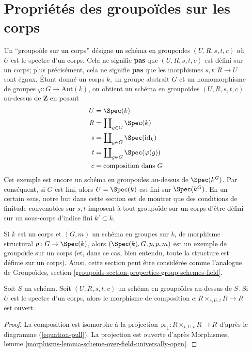 \section{Propriétés des groupoïdes sur les corps}
\label{section-properties-groupoids-on-fields}

\noindent
Un ``groupoïde sur un corps'' désigne un schéma en groupoïdes $(U, R, s, t, c)$
où $U$ est le spectre d'un corps. Cela ne signifie {\bf pas} que
$(U, R, s, t, c)$ est défini sur un corps; plus précisément, cela ne
signifie {\bf pas} que les morphismes $s, t : R \to U$ sont égaux.
Étant donné un corps $k$, un groupe abstrait $G$ et un homomorphisme de groupes
$\varphi : G \to \text{Aut}(k)$, on obtient un schéma en groupoïdes
$(U, R, s, t, c)$ au-dessus de $\mathbf{Z}$ en posant
\begin{align*}
U & = \Spec(k) \\
R & = \coprod\nolimits_{g \in G} \Spec(k) \\
s & = \coprod\nolimits_{g \in G} \Spec(\text{id}_k) \\
t & = \coprod\nolimits_{g \in G} \Spec(\varphi(g)) \\
c & = \text{composition dans }G
\end{align*}
Cet exemple est encore un schéma en groupoïdes au-dessus de $\Spec(k^G)$.
Par conséquent, si $G$ est fini, alors $U = \Spec(k)$ est fini sur
$\Spec(k^G)$.
En un certain sens, notre but dans cette section est de montrer que des
conditions de finitude convenables sur $s, t$ imposent à tout groupoïde sur un corps
d'être défini sur un sous-corps d'indice fini $k' \subset k$.

\medskip\noindent
Si $k$ est un corps et $(G, m)$ un schéma en groupes sur $k$, de morphisme
structural $p : G \to \Spec(k)$, alors $(\Spec(k), G, p, p, m)$
est un exemple de groupoïde sur un corps (et, dans ce cas, bien entendu, toute la
structure est définie sur un corps). Ainsi, cette section peut être considérée comme
l'analogue de
Groupoïdes, section \ref{groupoids-section-properties-group-schemes-field}.

\begin{lemma}
\label{lemma-groupoid-on-field-open-multiplication}
Soit $S$ un schéma. Soit $(U, R, s, t, c)$ un schéma en groupoïdes
au-dessus de $S$. Si $U$ est le spectre d'un corps, alors le morphisme de composition
$c : R \times_{s, U, t} R \to R$ est ouvert.
\end{lemma}

\begin{proof}
La composition est isomorphe à la projection
$\text{pr}_1 : R \times_{t, U, t} R \to R$ d'après le
diagramme (\ref{equation-pull}).
La projection est ouverte d'après
Morphismes, lemme \ref{morphisms-lemma-scheme-over-field-universally-open}.
\end{proof}

